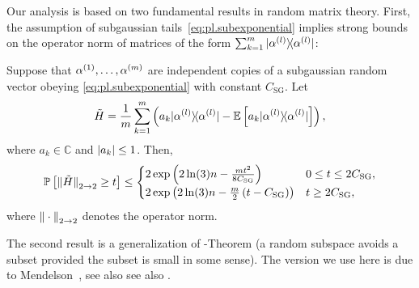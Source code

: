 Our analysis is based on two fundamental results in random matrix theory.
First, the assumption of subgaussian tails~\eqref{eq:pl.subexponential} implies strong bounds on the operator norm of matrices of the form $\sum_{k=1}^m \ketbra{\alpha\ind{l}}$:

\begin{theorem}%
  \label{thm:bernstein}
  Suppose that $\alpha^{(1)},\ldots,\alpha^{(m)}$ are independent copies of a subgaussian random vector obeying \cref{eq:pl.subexponential} with constant $C_\mathrm{SG}$.
  Let
  \[
    \tilde{ H} = \frac{1}{m} \sum_{k=1}^m \left( a_k \ketbra{\alpha\ind{l}} - \mathbb{E} \left[ a_k \ketbra{\alpha\ind{l}} \right] \right),
    \label{eq:pl.Htilde}
  \]
  where $a_k \in \mathbb{C}$ and ${\vert a_k\vert} \leq 1$.
  Then,
  \begin{align}
    \mathbb{P} \left[ {\Vert\tilde{ H}\Vert}_{2 \to 2} \geq t \right]
    \leq
    \begin{cases}
      2 \exp \left( 2 \ln (3) n  - \frac{mt^2}{8 C_\mathrm{SG}} \right) & 0 \leq t \leq 2C_\mathrm{SG}, \\
      2 \exp \left( 2 \ln (3) n - \frac{m}{2} \left( t - C_\mathrm{SG} \right)  \right) & t \geq 2 C_\mathrm{SG},
    \end{cases}
  \end{align}
  where ${\Vert\cdot\Vert}_{2 \to 2}$ denotes the operator norm.
\end{theorem}


The second result is a generalization of -Theorem \cite{Gordon_1988_On} (a random subspace avoids a subset provided the subset is small in some sense).
The version we use here is due to Mendelson~\cite{Mendelson_2015_Learning,Koltchinskii_2015_Bounding}, see also see also \cite{Tropp_2014_Convex}.

